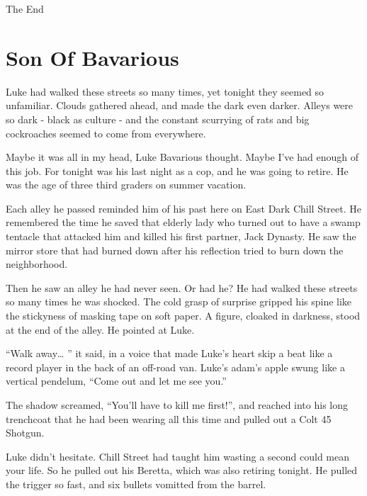 The End 
 



\chapter{Son Of Bavarious}





Luke had walked these streets so many times, yet tonight they
seemed so unfamiliar. Clouds gathered ahead, and made the dark even
darker. Alleys were so dark - black as culture - and the constant
scurrying of rats and big cockroaches seemed to come from
everywhere.



Maybe it was all in my head, Luke Bavarious thought. Maybe I've had
enough of this job. For tonight was his last night as a cop, and he
was going to retire. He was the age of three third graders on
summer vacation.



Each alley he passed reminded him of his past here on East Dark
Chill Street. He remembered the time he saved that elderly lady who
turned out to have a swamp tentacle that attacked him and killed
his first partner, Jack Dynasty. He saw the mirror store that had
burned down after his reflection tried to burn down the
neighborhood.



Then he saw an alley he had never seen. Or had he? He had walked
these streets so many times he was shocked. The cold grasp of
surprise gripped his spine like the stickyness of masking tape on
soft paper. A figure, cloaked in darkness, stood at the end of the
alley. He pointed at Luke.



``Walk away{\ldots} '' it said, in a voice that made Luke's heart skip a
beat like a record player in the back of an off-road van. Luke's
adam's apple swung like a vertical pendelum, ``Come out and let me
see you.''



The shadow screamed, ``You'll have to kill me first!'', and reached
into his long trenchcoat that he had been wearing all this time and
pulled out a Colt 45 Shotgun.



Luke didn't hesitate. Chill Street had taught him wasting a second
could mean your life. So he pulled out his Beretta, which was also
retiring tonight. He pulled the trigger so fast, and six bullets
vomitted from the barrel.



